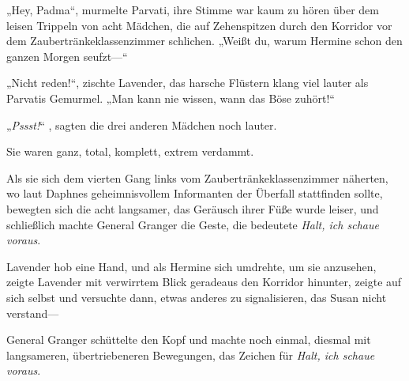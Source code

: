 „Hey, Padma“, murmelte Parvati, ihre Stimme war kaum zu hören über dem leisen Trippeln von acht Mädchen, die auf Zehenspitzen durch den Korridor vor dem Zaubertränkeklassenzimmer schlichen. „Weißt du, warum Hermine schon den ganzen Morgen seufzt—“

„Nicht reden!“, zischte Lavender, das harsche Flüstern klang viel lauter als Parvatis Gemurmel. „Man kann nie wissen, wann das Böse zuhört!“

„\emph{Pssst!}“ , sagten die drei anderen Mädchen noch lauter.

Sie waren ganz, total, komplett, extrem verdammt.

Als sie sich dem vierten Gang links vom Zaubertränkeklassenzimmer näherten, wo laut Daphnes geheimnisvollem Informanten der Überfall stattfinden sollte, bewegten sich die acht langsamer, das Geräusch ihrer Füße wurde leiser, und schließlich machte General Granger die Geste, die bedeutete \emph{Halt, ich schaue voraus}.

Lavender hob eine Hand, und als Hermine sich umdrehte, um sie anzusehen, zeigte Lavender mit verwirrtem Blick geradeaus den Korridor hinunter, zeigte auf sich selbst und versuchte dann, etwas anderes zu signalisieren, das Susan nicht verstand—

General Granger schüttelte den Kopf und machte noch einmal, diesmal mit langsameren, übertriebeneren Bewegungen, das Zeichen für \emph{Halt, ich schaue voraus}.

